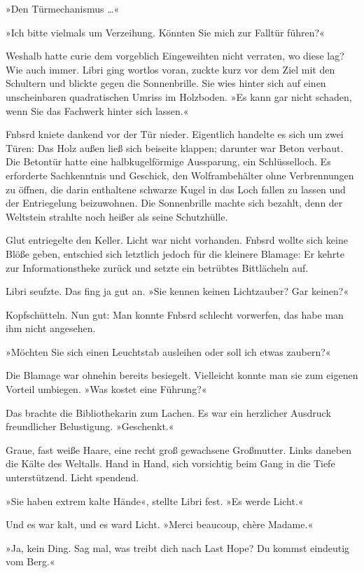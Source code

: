 »Den Türmechanismus …«

»Ich bitte vielmals um Verzeihung. Könnten Sie mich zur Falltür führen?«

Weshalb hatte curie dem vorgeblich Eingeweihten nicht verraten, wo diese lag? Wie auch immer. Libri ging wortlos voran, zuckte kurz vor dem Ziel mit den Schultern und blickte gegen die Sonnenbrille. Sie wies hinter sich auf einen unscheinbaren quadratischen Umriss im Holzboden. »Es kann gar nicht schaden, wenn Sie das Fachwerk hinter sich lassen.«

Fnbsrd kniete dankend vor der Tür nieder. Eigentlich handelte es sich um zwei Türen: Das Holz außen ließ sich beiseite klappen; darunter war Beton verbaut. Die Betontür hatte eine halbkugelförmige Aussparung, ein Schlüsselloch. Es erforderte Sachkenntnis und Geschick, den Wolframbehälter ohne Verbrennungen zu öffnen, die darin enthaltene schwarze Kugel in das Loch fallen zu lassen und der Entriegelung beizuwohnen. Die Sonnenbrille machte sich bezahlt, denn der Weltstein strahlte noch heißer als seine Schutzhülle.

Glut entriegelte den Keller. Licht war nicht vorhanden. Fnbsrd wollte sich keine Blöße geben, entschied sich letztlich jedoch für die kleinere Blamage: Er kehrte zur Informationstheke zurück und setzte ein betrübtes Bittlächeln auf.

Libri seufzte. Das fing ja gut an. »Sie kennen keinen Lichtzauber? Gar keinen?«

Kopfschütteln. Nun gut: Man konnte Fnbsrd schlecht vorwerfen, das habe man ihm nicht angesehen.

»Möchten Sie sich einen Leuchtstab ausleihen oder soll ich etwas zaubern?«

Die Blamage war ohnehin bereits besiegelt. Vielleicht konnte man sie zum eigenen Vorteil umbiegen. »Was kostet eine Führung?«

Das brachte die Bibliothekarin zum Lachen. Es war ein herzlicher Ausdruck freundlicher Belustigung. »Geschenkt.«

Graue, fast weiße Haare, eine recht groß gewachsene Großmutter. Links daneben die Kälte des Weltalls. Hand in Hand, sich vorsichtig beim Gang in die Tiefe unterstützend. Licht spendend.

»Sie haben extrem kalte Hände«, stellte Libri fest. »Es werde Licht.«

Und es war kalt, und es ward Licht. »Merci beaucoup, chère Madame.«

»Ja, kein Ding. Sag mal, was treibt dich nach Last Hope? Du kommst eindeutig vom Berg.«

